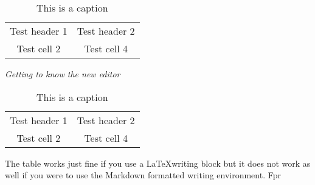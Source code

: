\begin{table} 
    \begin{tabular}{ c c }
        Test header 1 & Test header 2 \\ 
        Test cell 2 & Test cell 4 \\ 
    \end{tabular} 
    \caption{This is a caption} 
\end{table}\textit{Getting to know the new editor}

\begin{table} 
    \begin{tabular}{ c c }
        Test header 1 & Test header 2 \\ 
        Test cell 2 & Test cell 4 \\ 
    \end{tabular} 
    \caption{This is a caption} 
\end{table}

The table works just fine if you use a \LaTeX writing block but it does not work as well if you were to use the Markdown formatted writing environment. Fpr 
